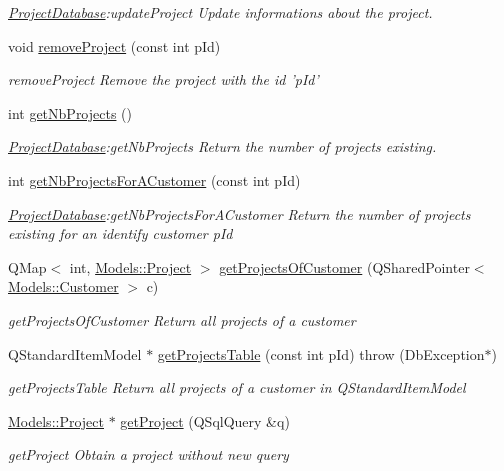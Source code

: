 \begin{DoxyCompactItemize}
\begin{DoxyCompactList}\small\item\em \hyperlink{classDatabase_1_1ProjectDatabase}{Project\+Database}\+:update\+Project Update informations about the project. \end{DoxyCompactList}\item 
void \hyperlink{classDatabase_1_1ProjectDatabase_a45fb24373d53e060d05cb166cd635370}{remove\+Project} (const int p\+Id)
\begin{DoxyCompactList}\small\item\em remove\+Project Remove the project with the id 'p\+Id' \end{DoxyCompactList}\item 
int \hyperlink{classDatabase_1_1ProjectDatabase_a57f293ea89b06e1cefff8189a5dc9444}{get\+Nb\+Projects} ()
\begin{DoxyCompactList}\small\item\em \hyperlink{classDatabase_1_1ProjectDatabase}{Project\+Database}\+:get\+Nb\+Projects Return the number of projects existing. \end{DoxyCompactList}\item 
int \hyperlink{classDatabase_1_1ProjectDatabase_a9d86e98ae77eaef7875c36c84e08722b}{get\+Nb\+Projects\+For\+A\+Customer} (const int p\+Id)
\begin{DoxyCompactList}\small\item\em \hyperlink{classDatabase_1_1ProjectDatabase}{Project\+Database}\+:get\+Nb\+Projects\+For\+A\+Customer Return the number of projects existing for an identify customer {\itshape p\+Id} \end{DoxyCompactList}\item 
Q\+Map$<$ int, \hyperlink{classModels_1_1Project}{Models\+::\+Project} $>$ \hyperlink{classDatabase_1_1ProjectDatabase_a1bbdbcb01b9741800e49902d0783e5f3}{get\+Projects\+Of\+Customer} (Q\+Shared\+Pointer$<$ \hyperlink{classModels_1_1Customer}{Models\+::\+Customer} $>$ c)
\begin{DoxyCompactList}\small\item\em get\+Projects\+Of\+Customer Return all projects of a customer \end{DoxyCompactList}\item 
Q\+Standard\+Item\+Model $\ast$ \hyperlink{classDatabase_1_1ProjectDatabase_ad2da7cde75b3b84dcdf2771969950ae9}{get\+Projects\+Table} (const int p\+Id)  throw (\+Db\+Exception$\ast$)
\begin{DoxyCompactList}\small\item\em get\+Projects\+Table Return all projects of a customer in Q\+Standard\+Item\+Model \end{DoxyCompactList}\item 
\hyperlink{classModels_1_1Project}{Models\+::\+Project} $\ast$ \hyperlink{classDatabase_1_1ProjectDatabase_a360d570a10c3e9df38241a650e1a30a6}{get\+Project} (Q\+Sql\+Query \&q)
\begin{DoxyCompactList}\small\item\em get\+Project Obtain a project without new query \end{DoxyCompactList}\end{DoxyCompactItemize}
